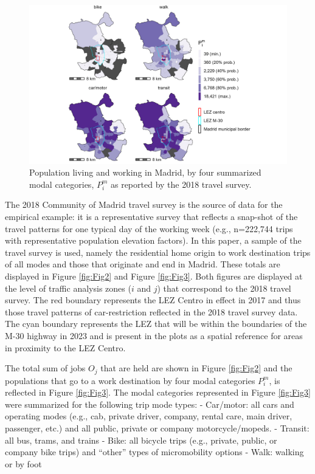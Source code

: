 \documentclass[numbered]{trbunofficial}
\begin{document}
\begin{figure}

{\centering \includegraphics[width=1\linewidth]{images/im_populations_zn208_plot} 

}

\caption{\label{fig:Fig3} Population living and working in Madrid, by four summarized modal categories, $P^m_i$ as reported by the 2018 travel survey.}\label{fig:pop-plot}
\end{figure}

The 2018 Community of Madrid travel survey is the source of data for the
empirical example: it is a representative survey that reflects a
snap-shot of the travel patterns for one typical day of the working week
(e.g., n=222,744 trips with representative population elevation
factors). In this paper, a sample of the travel survey is used, namely
the residential home origin to work destination trips of all modes and
those that originate and end in Madrid. These totals are displayed in
Figure \ref{fig:Fig2} and Figure \ref{fig:Fig3}. Both figures are
displayed at the level of traffic analysis zones (\(i\) and \(j\)) that
correspond to the 2018 travel survey. The red boundary represents the
LEZ Centro in effect in 2017 and thus those travel patterns of
car-restriction reflected in the 2018 travel survey data. The cyan
boundary represents the LEZ that will be within the boundaries of the
M-30 highway in 2023 and is present in the plots as a spatial reference
for areas in proximity to the LEZ Centro.

The total sum of jobs \(O_j\) that are held are shown in Figure
\ref{fig:Fig2} and the populations that go to a work destination by four
modal categories \(P^m_i\), is reflected in Figure \ref{fig:Fig3}. The
modal categories represented in Figure \ref{fig:Fig3} were summarized
for the following trip mode types: - Car/motor: all cars and operating
modes (e.g., cab, private driver, company, rental care, main driver,
passenger, etc.) and all public, private or company motorcycle/mopeds. -
Transit: all bus, trams, and trains - Bike: all bicycle trips (e.g.,
private, public, or company bike trips) and ``other'' types of
micromobility options - Walk: walking or by foot
\end{document}
